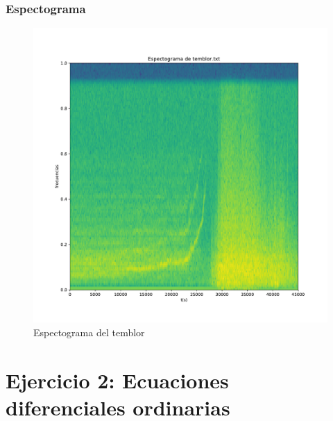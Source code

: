 \documentclass[11pt,letterpaper]{exam}
\begin{document}
\subsubsection{Espectograma}
\begin{figure}[H]
    \centering
    \includegraphics[width=1.1\textwidth]{espectograma_temblor.pdf}
    \caption{Espectograma del temblor}
    \label{fig:my_label}
\end{figure}
\section{Ejercicio 2: Ecuaciones diferenciales ordinarias}
\end{document}

